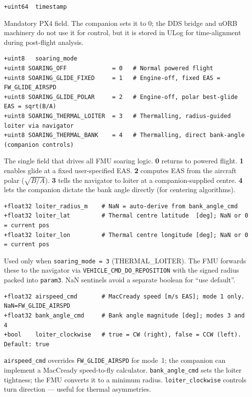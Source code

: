 \documentclass[12pt,a4paper]{article}
\begin{document}
\begin{lstlisting}[style=diff]
+uint64  timestamp
\end{lstlisting}
\begin{annotation}Mandatory PX4 field. The companion sets it to 0; the DDS bridge and uORB machinery do not use it for control, but it is stored in ULog for time-alignment during post-flight analysis.\end{annotation}

\begin{lstlisting}[style=diff]
+uint8   soaring_mode
+uint8 SOARING_OFF             = 0   # Normal powered flight
+uint8 SOARING_GLIDE_FIXED     = 1   # Engine-off, fixed EAS = FW_GLIDE_AIRSPD
+uint8 SOARING_GLIDE_POLAR     = 2   # Engine-off, polar best-glide EAS = sqrt(B/A)
+uint8 SOARING_THERMAL_LOITER  = 3   # Thermalling, radius-guided loiter via navigator
+uint8 SOARING_THERMAL_BANK    = 4   # Thermalling, direct bank-angle (companion controls)
\end{lstlisting}
\begin{annotation}The single field that drives all FMU soaring logic. \textbf{0} returns to powered flight. \textbf{1} enables glide at a fixed user-specified EAS. \textbf{2} computes EAS from the aircraft polar ($\sqrt{B/A}$). \textbf{3} tells the navigator to loiter at a companion-supplied centre. \textbf{4} lets the companion dictate the bank angle directly (for centering algorithms).\end{annotation}

\begin{lstlisting}[style=diff]
+float32 loiter_radius_m    # NaN = auto-derive from bank_angle_cmd
+float32 loiter_lat         # Thermal centre latitude  [deg]; NaN or 0 = current pos
+float32 loiter_lon         # Thermal centre longitude [deg]; NaN or 0 = current pos
\end{lstlisting}
\begin{annotation}Used only when \texttt{soaring\_mode = 3} (THERMAL\_LOITER). The FMU forwards these to the navigator via \texttt{VEHICLE\_CMD\_DO\_REPOSITION} with the signed radius packed into \texttt{param3}. NaN sentinels avoid a separate boolean for ``use default''.\end{annotation}

\begin{lstlisting}[style=diff]
+float32 airspeed_cmd       # MacCready speed [m/s EAS]; mode 1 only. NaN=FW_GLIDE_AIRSPD
+float32 bank_angle_cmd     # Bank angle magnitude [deg]; modes 3 and 4
+bool    loiter_clockwise   # true = CW (right), false = CCW (left). Default: true
\end{lstlisting}
\begin{annotation}\texttt{airspeed\_cmd} overrides \texttt{FW\_GLIDE\_AIRSPD} for mode~1; the companion can implement a MacCready speed-to-fly calculator. \texttt{bank\_angle\_cmd} sets the loiter tightness; the FMU converts it to a minimum radius. \texttt{loiter\_clockwise} controls turn direction — useful for thermal asymmetries.\end{annotation}
\end{document}
